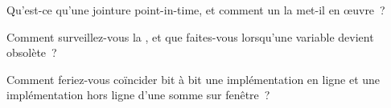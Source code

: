 \begin{interviewq}\label{iq:ml:data-and-feature-stores:4}
Qu'est-ce qu'une jointure point-in-time, et comment un  la met-il en œuvre~?
\end{interviewq}

\begin{interviewq}\label{iq:ml:data-and-feature-stores:5}
Comment surveillez-vous la , et que faites-vous lorsqu'une variable devient obsolète~?
\end{interviewq}

\begin{interviewq}\label{iq:ml:data-and-feature-stores:6}
Comment feriez-vous coïncider bit à bit une implémentation en ligne et une implémentation hors ligne d'une somme sur fenêtre~?
\end{interviewq}
